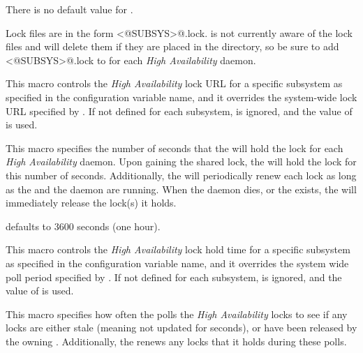 \begin{description}
  There is no default value for .

  Lock files are in the form \verb@<@SUBSYS\verb@>@.lock.
   is not currently aware of the lock files and will
  delete them if they are placed in the  directory, so be
  sure to add \verb@<@SUBSYS\verb@>@.lock to  for each
  \emph{High Availability} daemon.

\item[\Macro{HA\_<SUBSYS>\_LOCK\_URL}]
  \label{param:HASubsysLockURL} This macro controls the 
  \emph{High Availability} lock URL for a specific subsystem
  as specified in the configuration variable name,
  and it overrides the system-wide lock URL specified by
  .  If not defined for each subsystem,
   is ignored, and the value of
   is used.

\item[\Macro{HA\_LOCK\_HOLD\_TIME}] \label{param:HALockHoldTime}
  This macro
  specifies the number of seconds that the  will hold the
  lock for each \emph{High Availability} daemon.
  Upon gaining the shared lock,
  the  will hold the lock for this number of seconds.
  Additionally, the  will periodically renew
  each lock as long as the  and the daemon are running.
  When the daemon dies, or the  exists, the
   will immediately release the lock(s) it holds.

   defaults to 3600 seconds (one hour).

\item[\Macro{HA\_<SUBSYS>\_LOCK\_HOLD\_TIME}]
  \label{param:HASubsysLockHoldTime}
  This macro controls the \emph{High Availability} lock
  hold time for a specific subsystem
  as specified in the configuration variable name,
  and it overrides the system wide poll period specified by
  .
  If not defined for each subsystem,
   is ignored,
  and the value of  is used.

\item[\Macro{HA\_POLL\_PERIOD}] \label{param:HALockPollPeriod} 
  This macro specifies how often the  polls the
  \emph{High Availability} locks to see if any locks are either stale
  (meaning not updated for  seconds),
  or have been released by the owning .
  Additionally, the  renews any locks that it
  holds during these polls.


\end{description}
